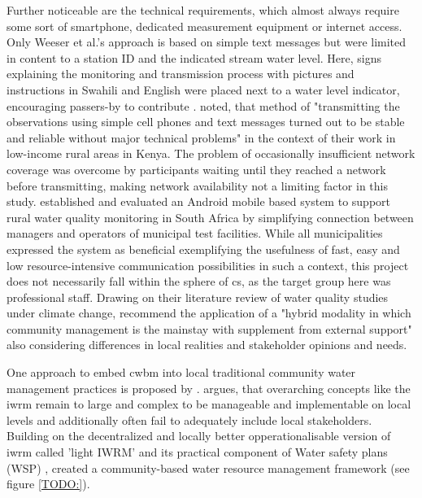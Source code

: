 Further noticeable are the technical requirements, which almost always require some sort of smartphone, dedicated measurement equipment or internet access. Only Weeser et al.'s approach is based on simple text messages but were limited in content to a station ID and the indicated stream water level. Here, signs explaining the monitoring and transmission process with pictures and instructions in Swahili and English were placed next to a water level indicator, encouraging passers-by to contribute \autocite{weeserCitizenSciencePioneers2018a}. \autocite[1597]{weeserCitizenSciencePioneers2018a} noted, that method of "transmitting the observations using simple cell phones and text messages turned out to be stable and reliable without major technical problems" in the context of their work in low-income rural areas in Kenya. The problem of occasionally insufficient network coverage was overcome by participants waiting until they reached a network before transmitting, making network availability not a limiting factor in this study. \autocite{wilson-jonesUsingMobilePhones2012} established and evaluated an Android mobile based system to support rural water quality monitoring in South Africa by simplifying connection between managers and operators of municipal test facilities. While all municipalities expressed the system as beneficial exemplifying the usefulness of fast, easy and low resource-intensive communication possibilities in such a context, this project does not necessarily fall within the sphere of \acrshort*{cs}, as the target group here was professional staff. Drawing on their literature review of water quality studies under climate change, \autocite[147]{huangManagementDrinkingWater2020} recommend the application of a "hybrid modality in which community management is the mainstay with supplement from external support" also considering differences in local realities and stakeholder opinions and needs. 

One approach to embed \acrshort*{cwbm} into local traditional community water management practices is proposed by \autocite{dayCommunitybasedWaterResources2009}. \autocite{dayCommunitybasedWaterResources2009} argues, that overarching concepts like the \acrfull*{iwrm} remain to large and complex to be manageable and implementable on local levels and additionally often fail to adequately include local stakeholders. Building on the decentralized and locally better opperationalisable version of \acrshort*{iwrm} called 'light IWRM' \autocite{butterworthFindingPracticalApproaches2010,moriartyIntegratedWaterResources2004} and its practical component of Water safety plans (WSP) \autocite{bartramWaterSafetyPlan2009}, \autocite{dayCommunitybasedWaterResources2009} created a community-based water resource management framework (see figure \ref*{TODO:}). 

